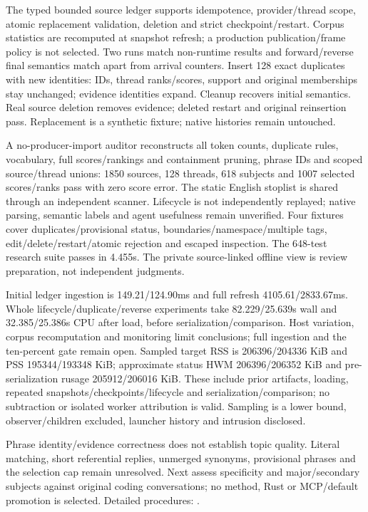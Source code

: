 \documentclass[11pt]{article}
\begin{document}
The typed bounded source ledger supports idempotence, provider/thread scope,
atomic replacement validation, deletion and strict checkpoint/restart. Corpus
statistics are recomputed at snapshot refresh; a production publication/frame
policy is not selected. Two runs match non-runtime results and forward/reverse
final semantics match apart from arrival counters. Insert 128 exact duplicates
with new identities: IDs, thread ranks/scores, support and original memberships
stay unchanged; evidence identities expand. Cleanup recovers initial semantics.
Real source deletion removes evidence; deleted restart and original reinsertion
pass. Replacement is a synthetic fixture; native histories remain untouched.

A no-producer-import auditor reconstructs all token counts, duplicate rules,
vocabulary, full scores/rankings and containment pruning, phrase IDs and scoped
source/thread unions: 1850 sources, 128 threads, 618 subjects and 1007 selected
scores/ranks pass with zero score error. The static English stoplist is shared
through an independent scanner. Lifecycle is not independently replayed; native
parsing, semantic labels and agent usefulness remain unverified. Four fixtures
cover duplicates/provisional status, boundaries/namespace/multiple tags,
edit/delete/restart/atomic rejection and escaped inspection. The 648-test
research suite passes in 4.455s. The private source-linked offline view is review
preparation, not independent judgments.

Initial ledger ingestion is 149.21/124.90ms and full refresh 4105.61/2833.67ms.
Whole lifecycle/duplicate/reverse experiments take 82.229/25.639s wall and
32.385/25.386s CPU after load, before serialization/comparison. Host variation,
corpus recomputation and monitoring limit conclusions; full ingestion and the
ten-percent gate remain open. Sampled target RSS is 206396/204336 KiB and
PSS 195344/193348 KiB; approximate status HWM 206396/206352 KiB and
pre-serialization rusage 205912/206016 KiB. These include prior artifacts,
loading, repeated snapshots/checkpoints/lifecycle and serialization/comparison;
no subtraction or isolated worker attribution is valid. Sampling is a lower
bound, observer/children excluded, launcher history and intrusion disclosed.

Phrase identity/evidence correctness does not establish topic quality. Literal
matching, short referential replies, unmerged synonyms, provisional phrases and
the selection cap remain unresolved. Next assess specificity and major/secondary
subjects against original coding conversations; no method, Rust or MCP/default
promotion is selected. Detailed procedures:
.
\end{document}
